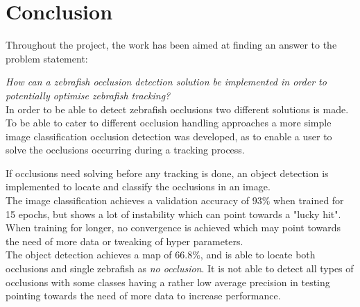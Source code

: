 \chapter{Conclusion}\label{ch:conclusion}\glsresetall
Throughout the project, the work has been aimed at finding an answer to the problem statement:

\textit{How can a zebrafish occlusion detection solution be implemented in order to potentially optimise zebrafish tracking?}\\

In order to be able to detect zebrafish occlusions two different solutions is made. To be able to cater to different occlusion handling approaches a more simple image classification occlusion detection was developed, as to enable a user to solve the occlusions occurring during a tracking process. 

If occlusions need solving before any tracking is done, an object detection is implemented to locate and classify the occlusions in an image.\\

The image classification achieves a validation accuracy of $93\%$ when trained for 15 epochs, but shows a lot of instability which can point towards a "lucky hit". When training for longer, no convergence is achieved which may point towards the need of more data or tweaking of hyper parameters.\\

The object detection achieves a \gls{map} of $66.8\%$, and is able to locate both occlusions and single zebrafish as \textit{no occlusion}. It is not able to detect all types of occlusions with some classes having a rather low average precision in testing pointing towards the need of more data to increase performance.